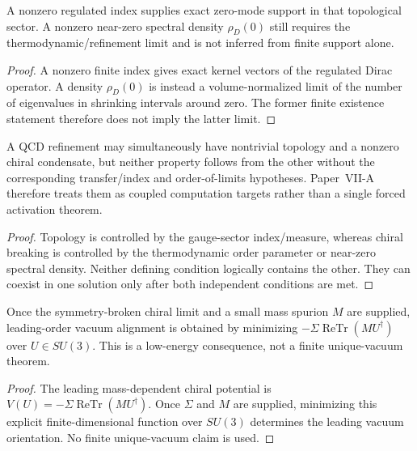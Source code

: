 \documentclass[12pt,a4paper]{article}
\begin{document}
\begin{theorem}
\label{p10:thm:topological-cell-density-near-zero-support}
A nonzero regulated index supplies exact zero-mode support in that topological sector.  A nonzero near-zero spectral density \(\rho_D(0)\) still requires the thermodynamic/refinement limit and is not inferred from finite support alone.
\end{theorem}
\begin{proof}
A nonzero finite index gives exact kernel vectors of the regulated Dirac operator.  A density $\rho_D(0)$ is instead a volume-normalized limit of the number of eigenvalues in shrinking intervals around zero.  The former finite existence statement therefore does not imply the latter limit.
\end{proof}

\begin{theorem}
\label{p10:thm:native-topological-chiral-condensation}
A QCD refinement may simultaneously have nontrivial topology and a nonzero chiral condensate, but neither property follows from the other without the corresponding transfer/index and order-of-limits hypotheses.  Paper~VII-A therefore treats them as coupled computation targets rather than a single forced activation theorem.
\end{theorem}
\begin{proof}
Topology is controlled by the gauge-sector index/measure, whereas chiral breaking is controlled by the thermodynamic order parameter or near-zero spectral density.  Neither defining condition logically contains the other.  They can coexist in one solution only after both independent conditions are met.
\end{proof}

\begin{theorem}
\label{p10:thm:chiral-vacuum-alignment}
Once the symmetry-broken chiral limit and a small mass spurion \(M\) are supplied, leading-order vacuum alignment is obtained by minimizing \(-\Sigma\operatorname{ReTr}(MU^\dagger)\) over \(U\in SU(3)\).  This is a low-energy consequence, not a finite unique-vacuum theorem.
\end{theorem}
\begin{proof}
The leading mass-dependent chiral potential is $V(U)=-\Sigma\operatorname{ReTr}(MU^\dagger)$.  Once $\Sigma$ and $M$ are supplied, minimizing this explicit finite-dimensional function over $SU(3)$ determines the leading vacuum orientation.  No finite unique-vacuum claim is used.
\end{proof}
\end{document}
